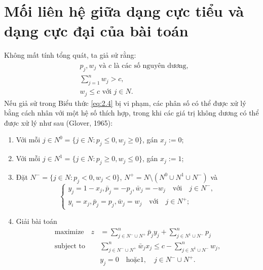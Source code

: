 
\section{Mối liên hệ giữa dạng cực tiểu và dạng cực đại của bài toán}

Không mất tính tổng quát, ta giả sử rằng:
\begin{align}
    \label{eq:2.4}
    &p_j, w_j \text{ và } c \text{ là các số nguyên dương},\\
    \label{eq:2.5}
    &\sum_{j = 1}^nw_j > c,\\
    \label{eq:2.6}
    &w_j \leq c \text{ với } j \in N.
\end{align}
Nếu giả sử trong Biểu thức \eqref{eq:2.4} bị vi phạm, các phân số có thể được xử lý bằng cách nhân với một hệ số thích hợp, trong khi các giá trị không dương có thể được xử lý như sau (Glover, 1965):
\begin{enumerate}
    \item Với mỗi $j \in N^0 = \{j \in N: p_j \leq 0, w_j \geq 0\}$, gán $x_j := 0$;
    \item Với mỗi $j \in N^1 = \{j \in N: p_j \geq 0, w_j \leq 0\}$, gán $x_j := 1$;
    \item Đặt $N^{-} = \{j \in N: p_j < 0, w_j < 0\}$, $N^{+} = N \setminus (N^0 \cup N^1 \cup N^{-})$ và 
    \begin{equation}
        \begin{cases}
            y_j = 1 - x_j, \bar{p}_j = - p_j, \bar{w}_j = -w_j \quad\text{với}\quad j \in N^{-},\\
            y_i = x_j, \bar{p}_j = p_j, \bar{w}_j = w_j \quad\text{với}\quad j \in N^{+};
        \end{cases}
    \end{equation}
    \item Giải bài toán
    \begin{align}
        \text{maximize}\quad z &= \sum_{j \in N^{-} \cup N^{+}}^n\bar{p}_jy_j + \sum_{j \in N^{1} \cup N^{-}}^n{p}_j \\
        \text{subject to}\quad &\sum_{j \in N^{-} \cup N^{+}}^n\bar{w}_jx_j \leq c - \sum_{j \in N^{1} \cup N^{-}}^nw_j,\\
        & y_j = 0 \quad \text{hoặc} 1,\quad j \in N^{-} \cup N^{+}.
    \end{align}
\end{enumerate}

